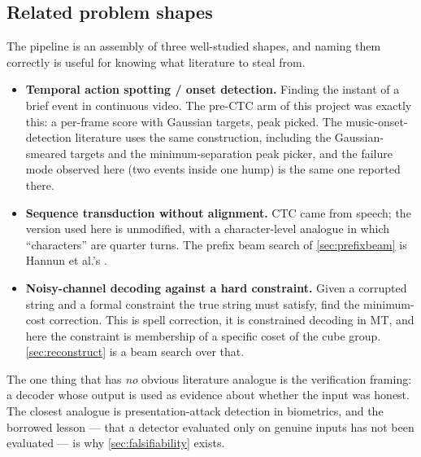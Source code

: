 \subsection{Related problem shapes}

The pipeline is an assembly of three well-studied shapes, and naming them
correctly is useful for knowing what literature to steal from.

\begin{itemize}[leftmargin=1.3em,itemsep=2pt]
\item \textbf{Temporal action spotting / onset detection.} Finding the
instant of a brief event in continuous video. The pre-CTC arm of this
project was exactly this: a per-frame score with Gaussian targets, peak
picked. The music-onset-detection literature \cite{bock2012} uses the same
construction, including the Gaussian-smeared targets and the
minimum-separation peak picker, and the failure mode observed here (two
events inside one hump) is the same one reported there.
\item \textbf{Sequence transduction without alignment.} CTC \cite{graves2006}
came from speech; the version used here is unmodified, with a
character-level analogue in which ``characters'' are quarter turns. The
prefix beam search of \cref{sec:prefixbeam} is Hannun et al.'s
\cite{hannun2014}.
\item \textbf{Noisy-channel decoding against a hard constraint.} Given a
corrupted string and a formal constraint the true string must satisfy, find
the minimum-cost correction. This is spell correction, it is constrained
decoding in MT, and here the constraint is membership of a specific coset of
the cube group. \cref{sec:reconstruct} is a beam search over that.
\end{itemize}

\noindent The one thing that has \emph{no} obvious literature analogue is
the verification framing: a decoder whose output is used as evidence about
whether the input was honest. The closest analogue is presentation-attack
detection in biometrics, and the borrowed lesson --- that a detector
evaluated only on genuine inputs has not been evaluated --- is why
\cref{sec:falsifiability} exists.
